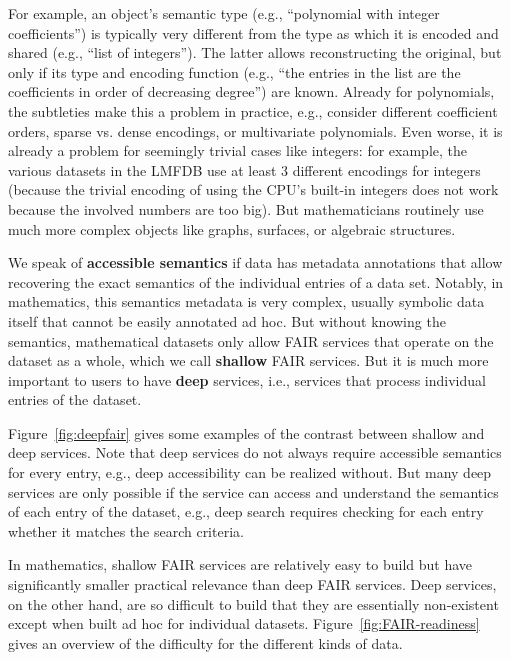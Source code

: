 For example, an object's semantic type (e.g., ``polynomial with integer coefficients'') is typically very different from the type as which it is encoded and shared (e.g., ``list of integers'').
The latter allows reconstructing the original, but only if its type and encoding function (e.g., ``the entries in the list are the coefficients in order of decreasing degree'') are known.
Already for polynomials, the subtleties make this a problem in practice, e.g., consider different coefficient orders, sparse vs. dense encodings, or multivariate polynomials.
Even worse, it is already a problem for seemingly trivial cases like integers: for example, the various datasets in the LMFDB use at least 3 different encodings for integers (because the trivial encoding of using the CPU's built-in integers does not work because the involved numbers are too big).
But mathematicians routinely use much more complex objects like graphs, surfaces, or algebraic structures.

We speak of \textbf{accessible semantics} if data has metadata annotations that allow recovering the exact semantics of the individual entries of a data set.
Notably, in mathematics, this semantics metadata is very complex, usually symbolic data itself that cannot be easily annotated ad hoc.
But without knowing the semantics, mathematical datasets only allow FAIR services that operate on the dataset as a whole, which we call \textbf{shallow} FAIR services.
But it is much more important to users to have \textbf{deep} services, i.e., services that process individual entries of the dataset.

Figure~\ref{fig:deepfair} gives some examples of the contrast between shallow and deep services.
Note that deep services do not always require accessible semantics for every entry, e.g., deep accessibility can be realized without.
But many deep services are only possible if the service can access and understand the semantics of each entry of the dataset, e.g., deep search requires checking for each entry whether it matches the search criteria.

In mathematics, shallow FAIR services are relatively easy to build but have significantly smaller practical relevance than deep FAIR services.
Deep services, on the other hand, are so difficult to build that they are essentially non-existent except when built ad hoc for individual datasets.
Figure~\ref{fig:FAIR-readiness} gives an overview of the difficulty for the different kinds of data.


